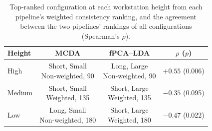 \begin{table}[htbp]
\centering
\small
\caption{Top-ranked configuration at each workstation height from each pipeline's weighted consistency ranking, and the agreement between the two pipelines' rankings of all configurations (Spearman's $\rho$).}
\label{tab:stage2_rankings}
\begin{tabular}{@{}lccc@{}}
\toprule
Height & MCDA & fPCA--LDA & $\rho$ ($p$) \\
\midrule
High & \shortstack{Short, Small\\Non-weighted, 90\textdegree{}} & \shortstack{Long, Large\\Non-weighted, 90\textdegree{}} & $+0.55$ (0.006) \\
\addlinespace
Medium & \shortstack{Short, Small\\Weighted, 135\textdegree{}} & \shortstack{Short, Large\\Weighted, 135\textdegree{}} & $-0.35$ (0.095) \\
\addlinespace
Low & \shortstack{Long, Small\\Non-weighted, 180\textdegree{}} & \shortstack{Short, Large\\Weighted, 180\textdegree{}} & $-0.47$ (0.022) \\
\bottomrule
\end{tabular}
\end{table}
